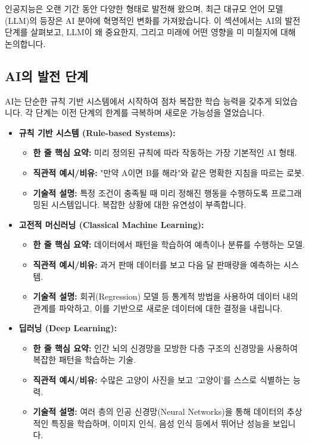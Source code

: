 \documentclass[11pt,a4paper]{article}
\begin{document}
인공지능은 오랜 기간 동안 다양한 형태로 발전해 왔으며, 최근 대규모 언어 모델(LLM)의 등장은 AI 분야에 혁명적인 변화를 가져왔습니다. 이 섹션에서는 AI의 발전 단계를 살펴보고, LLM이 왜 중요한지, 그리고 미래에 어떤 영향을 미 미칠지에 대해 논의합니다.

\subsection{AI의 발전 단계}

AI는 단순한 규칙 기반 시스템에서 시작하여 점차 복잡한 학습 능력을 갖추게 되었습니다. 각 단계는 이전 단계의 한계를 극복하며 새로운 가능성을 열었습니다.

\begin{itemize}
    \item \textbf{규칙 기반 시스템 (Rule-based Systems):}
    \begin{itemize}
        \item \textbf{한 줄 핵심 요약:} 미리 정의된 규칙에 따라 작동하는 가장 기본적인 AI 형태.
        \item \textbf{직관적 예시/비유:} "만약 A이면 B를 해라"와 같은 명확한 지침을 따르는 로봇.
        \item \textbf{기술적 설명:} 특정 조건이 충족될 때 미리 정해진 행동을 수행하도록 프로그래밍된 시스템입니다. 복잡한 상황에 대한 유연성이 부족합니다.
    \end{itemize}

    \item \textbf{고전적 머신러닝 (Classical Machine Learning):}
    \begin{itemize}
        \item \textbf{한 줄 핵심 요약:} 데이터에서 패턴을 학습하여 예측이나 분류를 수행하는 모델.
        \item \textbf{직관적 예시/비유:} 과거 판매 데이터를 보고 다음 달 판매량을 예측하는 시스템.
        \item \textbf{기술적 설명:} 회귀(Regression) 모델 등 통계적 방법을 사용하여 데이터 내의 관계를 파악하고, 이를 기반으로 새로운 데이터에 대한 결정을 내립니다.
    \end{itemize}

    \item \textbf{딥러닝 (Deep Learning):}
    \begin{itemize}
        \item \textbf{한 줄 핵심 요약:} 인간 뇌의 신경망을 모방한 다층 구조의 신경망을 사용하여 복잡한 패턴을 학습하는 기술.
        \item \textbf{직관적 예시/비유:} 수많은 고양이 사진을 보고 '고양이'를 스스로 식별하는 능력.
        \item \textbf{기술적 설명:} 여러 층의 인공 신경망(Neural Networks)을 통해 데이터의 추상적인 특징을 학습하며, 이미지 인식, 음성 인식 등에서 뛰어난 성능을 보입니다.
    \end{itemize}


\end{itemize}
\end{document}
